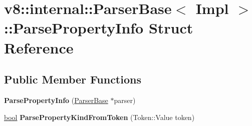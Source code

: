 \hypertarget{structv8_1_1internal_1_1ParserBase_1_1ParsePropertyInfo}{}\section{v8\+:\+:internal\+:\+:Parser\+Base$<$ Impl $>$\+:\+:Parse\+Property\+Info Struct Reference}
\label{structv8_1_1internal_1_1ParserBase_1_1ParsePropertyInfo}
\subsection*{Public Member Functions}
\begin{DoxyCompactItemize}
\item 
\mbox{\label{structv8_1_1internal_1_1ParserBase_1_1ParsePropertyInfo_af3a747c427219b5733a85b359ee6b7ad}} 
{\bfseries Parse\+Property\+Info} (\mbox{\hyperlink{classv8_1_1internal_1_1ParserBase}{Parser\+Base}} $\ast$parser)
\item 
\mbox{\label{structv8_1_1internal_1_1ParserBase_1_1ParsePropertyInfo_a66c5b76ed8b98a42b0eb58ad1d808c7b}} 
\mbox{\hyperlink{classbool}{bool}} {\bfseries Parse\+Property\+Kind\+From\+Token} (Token\+::\+Value token)
\end{DoxyCompactItemize}
